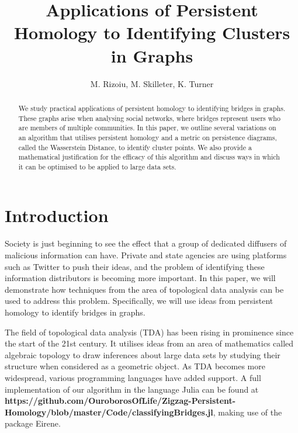 \documentclass[12pt,a4paper]{amsart}
\numberwithin{equation}{section}
\theoremstyle{plain}
\theoremstyle{definition}
\begin{document}
\title{Applications of Persistent Homology to Identifying Clusters in Graphs }


\author[]{M. Rizoiu, M. Skilleter, K. Turner}

\address{Australian National University \\ Mathematical Sciences Institute} 


\begin{abstract} We study practical applications of persistent homology to identifying bridges in graphs. These graphs arise when analysing social networks, where bridges represent users who are members of multiple communities. In this paper, we outline several variations on an algorithm that utilises persistent homology and a metric on persistence diagrams, called the Wasserstein Distance, to identify cluster points. We also provide a mathematical justification for the efficacy of this algorithm and discuss ways in which it can be optimised to be applied to large data sets.
\end{abstract}

\maketitle

\section{Introduction} Society is just beginning to see the effect that a group of dedicated diffusers of malicious information can have. Private and state agencies are using platforms such as Twitter to push their ideas, and the problem of identifying these information distributors is becoming more important. In this paper, we will demonstrate how techniques from the area of topological data analysis can be used to address this problem. Specifically, we will use ideas from persistent homology to identify bridges in graphs.

The field of topological data analysis (TDA) has been rising in prominence since the start of the 21st century. It utilises ideas from an area of mathematics called algebraic topology to draw inferences about large data sets by studying their structure when considered as a geometric object. As TDA becomes more widespread, various programming languages have added support. A full implementation of our algorithm in the language Julia can be found at \textbf{https://github.com/OuroborosOfLife/Zigzag-Persistent-Homology/blob/master/Code/classifyingBridges.jl}, making use of the package Eirene.
\end{document}
